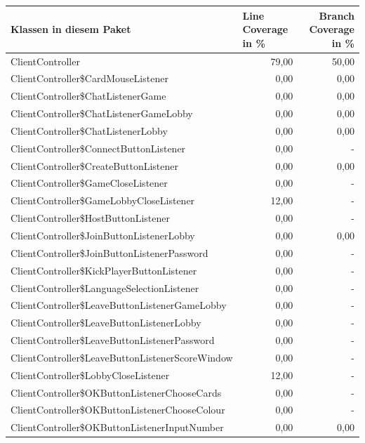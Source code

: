 \documentclass[a4paper]{article}
\begin{document}
\begin{tabular}{|l|r|r|}
\hline
Klassen in diesem Paket & \multicolumn{1}{l|}{Line Coverage in \%} & Branch Coverage in \% \\ \hline \hline
ClientController & 79,00 & \multicolumn{1}{r|}{50,00} \\ \hline
ClientController\$CardMouseListener & 0,00 & \multicolumn{1}{r|}{0,00} \\ \hline
ClientController\$ChatListenerGame & 0,00 & \multicolumn{1}{r|}{0,00} \\ \hline
ClientController\$ChatListenerGameLobby & 0,00 & \multicolumn{1}{r|}{0,00} \\ \hline
ClientController\$ChatListenerLobby & 0,00 & \multicolumn{1}{r|}{0,00} \\ \hline
ClientController\$ConnectButtonListener & 0,00 & - \\ \hline
ClientController\$CreateButtonListener & 0,00 & \multicolumn{1}{r|}{0,00} \\ \hline
ClientController\$GameCloseListener & 0,00 & - \\ \hline
ClientController\$GameLobbyCloseListener & 12,00 & - \\ \hline
ClientController\$HostButtonListener & 0,00 & - \\ \hline
ClientController\$JoinButtonListenerLobby & 0,00 & \multicolumn{1}{r|}{0,00} \\ \hline
ClientController\$JoinButtonListenerPassword & 0,00 & - \\ \hline
ClientController\$KickPlayerButtonListener & 0,00 & - \\ \hline
ClientController\$LanguageSelectionListener & 0,00 & - \\ \hline
ClientController\$LeaveButtonListenerGameLobby & 0,00 & - \\ \hline
ClientController\$LeaveButtonListenerLobby & 0,00 & - \\ \hline
ClientController\$LeaveButtonListenerPassword & 0,00 & - \\ \hline
ClientController\$LeaveButtonListenerScoreWindow & 0,00 & - \\ \hline
ClientController\$LobbyCloseListener & 12,00 & - \\ \hline
ClientController\$OKButtonListenerChooseCards & 0,00 & - \\ \hline
ClientController\$OKButtonListenerChooseColour & 0,00 & - \\ \hline
ClientController\$OKButtonListenerInputNumber & 0,00 & \multicolumn{1}{r|}{0,00} \\ \hline

\end{tabular}
\end{document}
